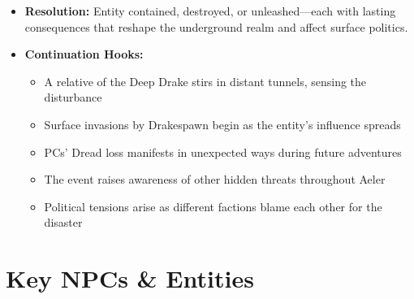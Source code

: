 \documentclass[11pt]{article}
\begin{document}
\begin{itemize}
\begin{itemize}
  \end{itemize}
\item \textbf{Resolution:} Entity contained, destroyed, or unleashed---each with lasting consequences that reshape the underground realm and affect surface politics.
\item \textbf{Continuation Hooks:}
  \begin{itemize}
  \item A relative of the Deep Drake stirs in distant tunnels, sensing the disturbance
  \item Surface invasions by Drakespawn begin as the entity's influence spreads
  \item PCs' Dread loss manifests in unexpected ways during future adventures
  \item The event raises awareness of other hidden threats throughout Aeler
  \item Political tensions arise as different factions blame each other for the disaster
  \end{itemize}
\end{itemize}

\section{Key NPCs \& Entities}
\end{document}
